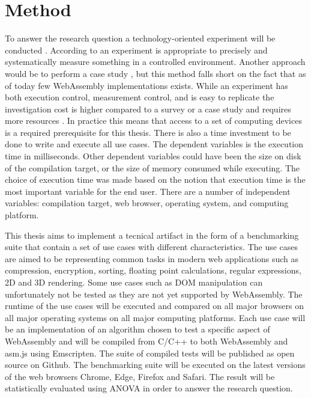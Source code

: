 \section{Method}
\label{method}

To answer the research question a technology-oriented experiment will be conducted \parencite{WohlinRunesonHostOhlssonRegnellWesslen2012}. According to \textcite{WohlinRunesonHostOhlssonRegnellWesslen2012} an experiment is appropriate to precisely and systematically measure something in a controlled environment. Another approach would be to perform a case study \parencite{WohlinRunesonHostOhlssonRegnellWesslen2012}, but this method falls short on the fact that as of today few WebAssembly implementations exists. While an experiment has both execution control, measurement control, and is easy to replicate the investigation cost is higher compared to a survey or a case study and requires more resources \parencite{WohlinRunesonHostOhlssonRegnellWesslen2012}. In practice this means that access to a set of computing devices is a required prerequisite for this thesis. There is also a time investment to be done to write and execute all use cases. The dependent variables is the execution time in milliseconds. Other dependent variables could have been the size on disk of the compilation target, or the size of memory consumed while executing. The choice of execution time was made based on the notion that execution time is the most important variable for the end user. There are a number of independent variables: compilation target, web browser, operating system, and computing platform.

This thesis aims to implement a tecnical artifact in the form of a benchmarking suite that contain a set of use cases with different characteristics. The use cases are aimed to be representing common tasks \parencite{WohlinRunesonHostOhlssonRegnellWesslen2012} in modern web applications such as compression, encryption, sorting, floating point calculations, regular expressions, 2D and 3D rendering. Some use cases such as DOM manipulation can unfortunately not be tested as they are not yet supported by WebAssembly. The runtime of the use cases will be executed and compared on all major browsers on all major operating systems on all major computing platforms. Each use case will be an implementation of an algorithm chosen to test a specific aspect of WebAssembly and will be compiled from C/C++ to both WebAssembly and asm.js using Emscripten. The suite of compiled tests will be published as open source on Github. The benchmarking suite will be executed on the latest versions of the web browsers Chrome, Edge, Firefox and Safari. The result will be statistically evaluated using ANOVA in order to answer the research question.

